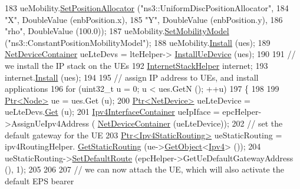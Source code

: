 \begin{DoxyCode}
183       ueMobility.\hyperlink{classns3_1_1MobilityHelper_ac59d5295076be3cc11021566713a28c5}{SetPositionAllocator} (\textcolor{stringliteral}{"ns3::UniformDiscPositionAllocator"},
184                                         \textcolor{stringliteral}{"X"}, DoubleValue (enbPosition.x),
185                                         \textcolor{stringliteral}{"Y"}, DoubleValue (enbPosition.y),
186                                         \textcolor{stringliteral}{"rho"}, DoubleValue (100.0));
187       ueMobility.\hyperlink{classns3_1_1MobilityHelper_a030275011b6f40682e70534d30280aba}{SetMobilityModel} (\textcolor{stringliteral}{"ns3::ConstantPositionMobilityModel"});
188       ueMobility.\hyperlink{classns3_1_1MobilityHelper_a07737960ee95c0777109cf2994dd97ae}{Install} (ues);
189       \hyperlink{classns3_1_1NetDeviceContainer}{NetDeviceContainer} ueLteDevs = lteHelper->
      \hyperlink{classns3_1_1LteHelper_ac9cd932d7de92811cfa953c2e3b2fc9f}{InstallUeDevice} (ues);
190        
191       \textcolor{comment}{// we install the IP stack on the UEs }
192       \hyperlink{classns3_1_1InternetStackHelper}{InternetStackHelper} internet;
193       internet.\hyperlink{classns3_1_1InternetStackHelper_a6645b412f31283d2d9bc3d8a95cebbc0}{Install} (ues);
194 
195       \textcolor{comment}{// assign IP address to UEs, and install applications}
196       \textcolor{keywordflow}{for} (uint32\_t u = 0; u < ues.GetN (); ++u)
197         \{
198 
199           \hyperlink{classns3_1_1Ptr}{Ptr<Node>} ue = ues.Get (u);          
200           \hyperlink{classns3_1_1Ptr}{Ptr<NetDevice>} ueLteDevice = ueLteDevs.\hyperlink{classns3_1_1NetDeviceContainer_a677d62594b5c9d2dea155cc5045f4d0b}{Get} (u);
201           \hyperlink{classns3_1_1Ipv4InterfaceContainer}{Ipv4InterfaceContainer} ueIpIface = epcHelper->AssignUeIpv4Address (
      \hyperlink{classns3_1_1NetDeviceContainer}{NetDeviceContainer} (ueLteDevice));
202           \textcolor{comment}{// set the default gateway for the UE}
203           \hyperlink{classns3_1_1Ptr}{Ptr<Ipv4StaticRouting>} ueStaticRouting = ipv4RoutingHelper.
      \hyperlink{classns3_1_1Ipv4StaticRoutingHelper_a731206e50d305695dac7fb2ef963a4bb}{GetStaticRouting} (ue->\hyperlink{classns3_1_1Object_a13e18c00017096c8381eb651d5bd0783}{GetObject}<\hyperlink{classns3_1_1Ipv4}{Ipv4}> ());          
204           ueStaticRouting->\hyperlink{classns3_1_1Ipv4StaticRouting_aee30fa3246c2b42f122dabdff2725331}{SetDefaultRoute} (epcHelper->GetUeDefaultGatewayAddress (), 1);
205 
206 
207           \textcolor{comment}{// we can now attach the UE, which will also activate the default EPS bearer}

\end{DoxyCode}
